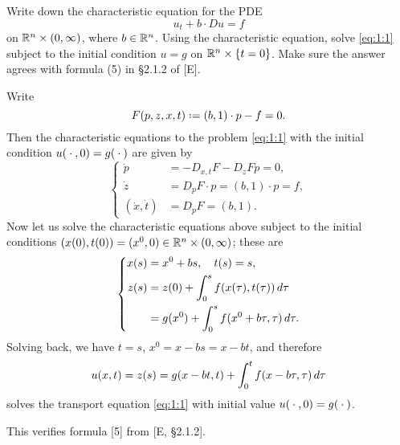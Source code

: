 \begin{problem}
  Write down the characteristic equation for the PDE
  \[
    \label{eq:1:1}
    \tag{\(*\)}
    u_t+b\cdot Du=f
  \]
  on \(\mathbb{R}^n\times(0,\infty)\), where \(b\in\mathbb{R}^n\). Using the
  characteristic equation, solve \eqref{eq:1:1} subject to the initial
  condition \(u=g\) on \(\mathbb{R}^n\times\{t=0\}\). Make sure the answer agrees
  with formula (5) in \S 2.1.2 of [E].
\end{problem}
\begin{solution*}
  Write
  \[
    F(p,z,x,t)\defeq (b,1)\cdot p-f=0.
  \]
  Then the characteristic equations to the problem \eqref{eq:1:1} with the
  initial condition \(u({}\cdot{},0)=g({}\cdot{})\) are given by
  \[
    \left\{
      \begin{aligned}
        \dot p&=-D_{x,t}F-D_zFp=0,\\
        \dot z&=D_pF\cdot p=(b,1)\cdot p=f,\\
        (\dot x,\dot t)&=D_pF=(b,1).
      \end{aligned}
    \right.
  \]
  Now let us solve the characteristic equations above subject to the
  initial conditions \((x(0),t(0))=(x^0,0)\in\mathbb{R}^n\times(0,\infty)\);
  these are
  \[
    \left\{
      \begin{aligned}
        x(s)
        &=x^0+bs,\quad t(s)=s,\\
        z(s)
        &=z(0)+\int_0^s f(x(\tau),t(\tau))\mathop{}\!d\tau\\
        &=g(x^0)+\int_0^s f(x^0+b\tau,\tau)\mathop{}\!d\tau.
      \end{aligned}
    \right.
  \]
  Solving back, we have \(t=s\), \(x^0=x-bs=x-bt\), and therefore
  \[
    u(x,t)=z(s)=g(x-bt,t)+\int_0^t f(x-b\tau, \tau)\mathop{}\!d\tau
  \]
  solves the transport equation \eqref{eq:1:1} with initial value
  \(u({}\cdot{},0)=g({}\cdot{})\).

  This verifies formula [5] from [E, \S 2.1.2].
\end{solution*}

